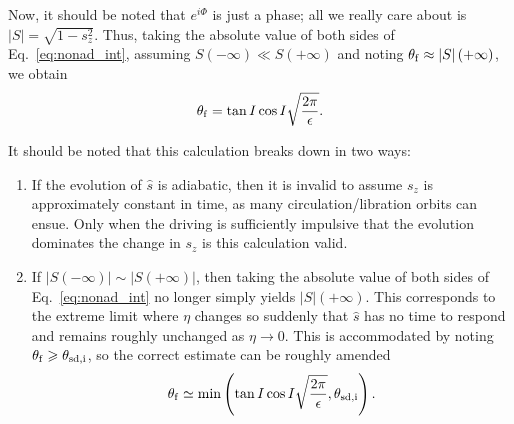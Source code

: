 \documentclass[
        fleqn,
        usenatbib,
        referee,
    ]{mnras}
\newcommand*{\abs}[1]{\left|#1\right|}
\newcommand*{\p}[1]{\left(#1\right)}
\begin{document}
Now, it should be noted that $e^{i\Phi}$ is just a phase; all we really care
about is $\abs{S} = \sqrt{1 - s_z^2}$. Thus, taking the absolute value of both
sides of Eq.~\eqref{eq:nonad_int}, assuming $S\p{-\infty} \ll S\p{+\infty}$ and
noting $\theta_{\rm f} \approx \abs{S}(+\infty)$, we obtain
\begin{equation}
    \theta_{\rm f} = \tan I\cos I\sqrt{\frac{2\pi}{\epsilon}}.
        \label{eq:nonad_dong}
\end{equation}

It should be noted that this calculation breaks down in two ways:
\begin{enumerate}
    \item If the evolution of $\hat{s}$ is adiabatic, then it is invalid to
        assume $s_z$ is approximately constant in time, as many
        circulation/libration orbits can ensue. Only when the driving is
        sufficiently impulsive that the evolution dominates the change in $s_z$
        is this calculation valid.

    \item If $\abs{S\p{-\infty}} \sim \abs{S\p{+\infty}}$, then taking the
        absolute value of both sides of Eq.~\eqref{eq:nonad_int} no longer
        simply yields $\abs{S}\p{+\infty}$. This corresponds to the extreme
        limit where $\eta$ changes so suddenly that $\hat{s}$ has no time to
        respond and remains roughly unchanged as $\eta \to 0$. This is
        accommodated by noting $\theta_{\rm f} \geq \theta_{\rm sd, i}$, so the
        correct estimate can be roughly amended
        \begin{equation}
            \theta_{\rm f} \simeq \min\p{\tan I\cos
                I\sqrt{\frac{2\pi}{\epsilon}}, \theta_{\rm sd, i}}.
        \end{equation}
\end{enumerate}

\bsp
\label{lastpage} %
\end{document}
